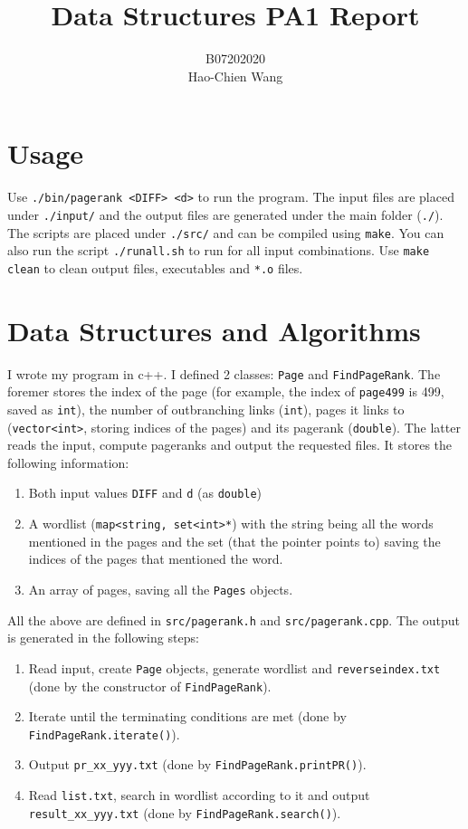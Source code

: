 \documentclass[12pt]{article}
\title{Data Structures PA1 Report}
\author{{\scriptsize B07202020}\\Hao-Chien Wang}
\begin{document}
\maketitle

\section{Usage}%
Use \texttt{./bin/pagerank <DIFF> <d>} to run the program. The input files are
placed under \texttt{./input/} and the output files are generated under the main
folder (\texttt{./}). The scripts are placed under \texttt{./src/} and can be 
compiled using \texttt{make}. You can also run the script \texttt{./runall.sh}
to run for all input combinations. Use \texttt{make clean} to clean output files,
executables and \texttt{*.o} files.

\section{Data Structures and Algorithms}%

I wrote my program in c++. I defined 2 classes: \texttt{Page} and 
\texttt{FindPageRank}. The foremer stores the index of the page (for example,
the index of \texttt{page499} is 499, saved as \texttt{int}), the number of 
outbranching links (\texttt{int}), pages it links to (\texttt{vector<int>}, storing
indices of the pages) and its pagerank (\texttt{double}). The latter reads
the input, compute pageranks and output the requested files. It stores the following
information:
\begin{enumerate}
	\item Both input values \texttt{DIFF} and \texttt{d} (as \texttt{double})
	\item A wordlist (\texttt{map<string, set<int>*}) with the string being all
		the words mentioned in the pages and the set (that the pointer points 
		to) saving the indices of the pages that mentioned the word. 
	\item An array of pages, saving all the \texttt{Pages} objects.
\end{enumerate}
All the above are defined in \texttt{src/pagerank.h} and \texttt{src/pagerank.cpp}. 
The output is generated in the following steps:

\begin{enumerate}
	\item Read input, create \texttt{Page} objects, generate wordlist and
		\texttt{reverseindex.txt} (done by the constructor of \texttt{FindPageRank}).
	\item Iterate until the terminating conditions are met (done by 
		\texttt{FindPageRank.iterate()}).
	\item Output \texttt{pr\_xx\_yyy.txt} (done by \texttt{FindPageRank.printPR()}).
	\item Read \texttt{list.txt}, search in wordlist according to it and output 
		\texttt{result\_xx\_yyy.txt} (done by \texttt{FindPageRank.search()}).
\end{enumerate}
\end{document}
